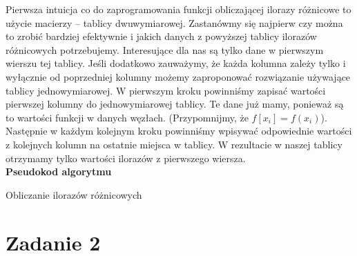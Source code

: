 \documentclass[]{article}
\begin{document}
	\noindent Pierwsza intuicja co do zaprogramowania funkcji obliczającej ilorazy różnicowe to użycie macierzy -- tablicy dwuwymiarowej. Zastanówmy się najpierw czy można to zrobić bardziej efektywnie i jakich danych z powyższej tablicy ilorazów różnicowych potrzebujemy. Interesujące dla nas są tylko dane w pierwszym wierszu tej tablicy. Jeśli dodatkowo zauważymy, że każda kolumna zależy tylko i wyłącznie od poprzedniej kolumny możemy zaproponować rozwiązanie używające tablicy jednowymiarowej. W pierwszym kroku powinniśmy zapisać wartości pierwszej kolumny do jednowymiarowej tablicy. Te dane już mamy, ponieważ są to wartości funkcji w danych węzłach. (Przypomnijmy, że $f[x_i] = f(x_i)$). Następnie w każdym kolejnym kroku powinniśmy wpisywać odpowiednie
	wartości z kolejnych kolumn na ostatnie miejsca w tablicy. W rezultacie w naszej tablicy otrzymamy tylko wartości ilorazów z pierwszego wiersza.\\
	\clearpage
	\noindent\textbf{Pseudokod algorytmu}\\
	\begin{algorithm}[h]
		\DontPrintSemicolon
		
		
		\caption{Obliczanie ilorazów różnicowych}
	\end{algorithm}
	
	\section*{Zadanie 2}
	
\end{document}
